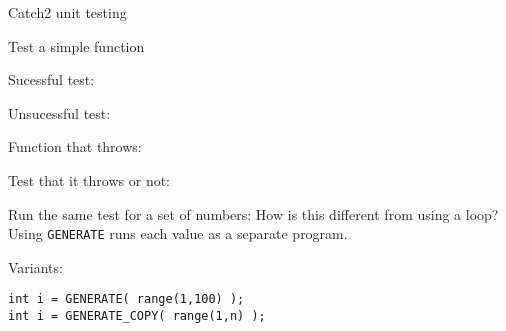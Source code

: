  {Catch2 unit testing}

Test a simple function

Sucessful test:

Unsucessful test:

Function that throws:

Test that it throws or not:

Run the same test for a set of numbers:
How is this different from using a loop?
Using \lstinline{GENERATE} runs each value as a separate program.

Variants:
\begin{lstlisting}
int i = GENERATE( range(1,100) );
int i = GENERATE_COPY( range(1,n) );
\end{lstlisting}
